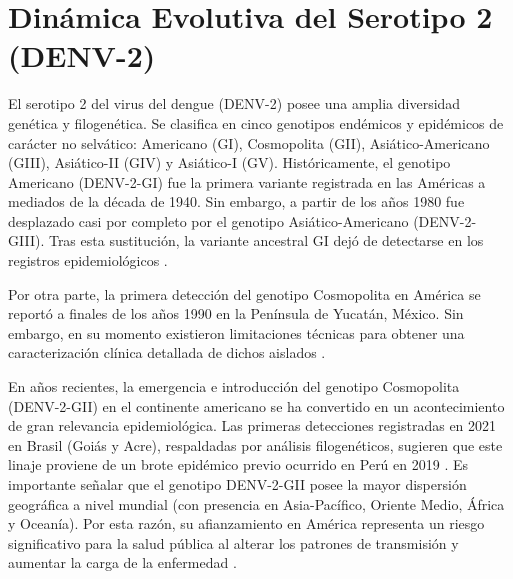\section{Dinámica Evolutiva del Serotipo 2 (DENV-2)}
El serotipo 2 del virus del dengue (DENV-2) posee una amplia diversidad genética y filogenética. Se clasifica en cinco genotipos endémicos y epidémicos de carácter no selvático: Americano (GI), Cosmopolita (GII), Asiático-Americano (GIII), Asiático-II (GIV) y Asiático-I (GV). Históricamente, el genotipo Americano (DENV-2-GI) fue la primera variante registrada en las Américas a mediados de la década de 1940. Sin embargo, a partir de los años 1980 fue desplazado casi por completo por el genotipo Asiático-Americano (DENV-2-GIII). Tras esta sustitución, la variante ancestral GI dejó de detectarse en los registros epidemiológicos \cite{allicock2012phylogeography}.

Por otra parte, la primera detección del genotipo Cosmopolita en América se reportó a finales de los años 1990 en la Península de Yucatán, México. Sin embargo, en su momento existieron limitaciones técnicas para obtener una caracterización clínica detallada de dichos aislados \cite{hou2024fullerene}.

En años recientes, la emergencia e introducción del genotipo Cosmopolita (DENV-2-GII) en el continente americano se ha convertido en un acontecimiento de gran relevancia epidemiológica. Las primeras detecciones registradas en 2021 en Brasil (Goiás y Acre), respaldadas por análisis filogenéticos, sugieren que este linaje proviene de un brote epidémico previo ocurrido en Perú en 2019 \cite{amorim2023emergence}. Es importante señalar que el genotipo DENV-2-GII posee la mayor dispersión geográfica a nivel mundial (con presencia en Asia-Pacífico, Oriente Medio, África y Oceanía). Por esta razón, su afianzamiento en América representa un riesgo significativo para la salud pública al alterar los patrones de transmisión y aumentar la carga de la enfermedad \cite{hou2024fullerene}. 
